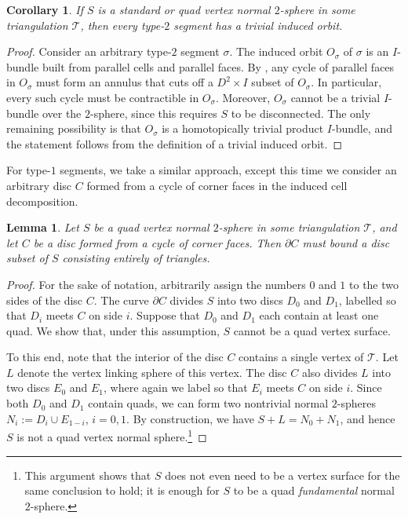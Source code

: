 \documentclass[10pt,a4paper]{amsart}
\newtheorem{lemma}[theorem]{Lemma}
\newtheorem{corollary}[theorem]{Corollary}
\newcommand{\tri}{\mathcal{T}}
\begin{document}
\begin{corollary}\label{cor:parallelRegion}
If $S$ is a standard or quad vertex normal $2$-sphere in some triangulation $\tri$, then every type-$2$ segment has a trivial induced orbit.
\end{corollary}

\begin{proof}
Consider an arbitrary type-$2$ segment $\sigma$.
The induced orbit $O_\sigma$ of $\sigma$ is an $I$-bundle built from parallel cells and parallel faces.
By , any cycle of parallel faces in $O_\sigma$ must form an annulus that cuts off a $D^2\times I$ subset of $O_\sigma$. In particular, every such cycle must be contractible in $O_\sigma$.
Moreover, $O_\sigma$ cannot be a trivial $I$-bundle over the $2$-sphere, since this requires $S$ to be disconnected.
The only remaining possibility is that $O_\sigma$ is a homotopically trivial product $I$-bundle, and the statement follows from the definition of a trivial induced orbit.
\end{proof}

For type-$1$ segments, we take a similar approach, except this time we consider an arbitrary disc $C$ formed from a cycle of corner faces in the induced cell decomposition.

\begin{lemma}\label{lem:cycleCorner}
Let $S$ be a quad vertex normal $2$-sphere in some triangulation $\tri$, and let $C$ be a disc formed from a cycle of corner faces. Then $\partial C$ must bound a disc subset of $S$ consisting entirely of triangles.
\end{lemma}



\begin{proof}
For the sake of notation, arbitrarily assign the numbers $0$ and $1$ to the two sides of the disc $C$.
The curve $\partial C$ divides $S$ into two discs $D_0$ and $D_1$, labelled so that $D_i$ meets $C$ on side $i$.
Suppose that $D_0$ and $D_1$ each contain at least one quad.
We show that, under this assumption, $S$ cannot be a quad vertex surface.

To this end, note that the interior of the disc $C$ contains a single vertex of $\tri$.
Let $L$ denote the vertex linking sphere of this vertex.
The disc $C$ also divides $L$ into two discs $E_0$ and $E_1$, where again we label so that $E_i$ meets $C$ on side $i$.
Since both $D_0$ and $D_1$ contain quads, we can form two nontrivial normal $2$-spheres $N_i := D_i\cup E_{1-i}$, $i=0,1$. By construction, we have $S + L = N_0 + N_1$, and hence $S$ is not a quad vertex normal sphere.\footnote{%
This argument shows that $S$ does not even need to be a vertex surface for the same conclusion to hold;
it is enough for $S$ to be a quad \emph{fundamental} normal $2$-sphere.}
\end{proof}
\end{document}
